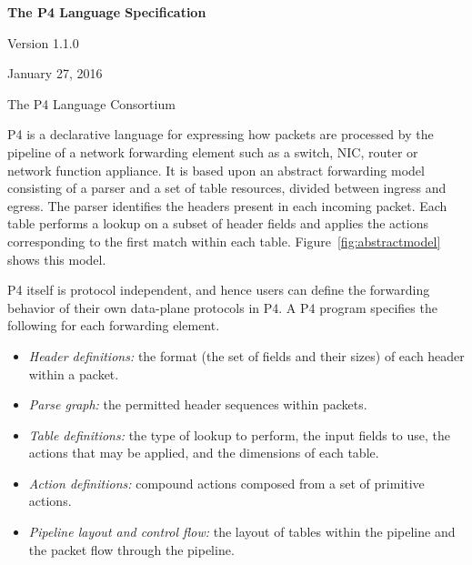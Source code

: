 \documentclass[12pt]{article}
\begin{document}
\vspace{2cm}

\centerline{\sffamily\bfseries\huge The P4 Language Specification}
\vspace{3mm}
\centerline{\sffamily\Large Version 1.1.0}
\vspace{3mm}
\centerline{\sffamily\large January 27, 2016}
\vspace{8mm}
\centerline{\sffamily\large The P4 Language Consortium}

\date{January 27, 2016}
\thispagestyle{firstpagestyle}


P4 is a declarative language for expressing how packets are processed by the 
pipeline of a network forwarding element such as a switch, NIC, router or 
network function appliance. It is based upon an abstract forwarding model 
consisting of a parser and a set of \matchaction table resources, divided 
between ingress and egress. The parser identifies the headers present in 
each incoming packet. Each \matchaction table performs a lookup on a subset 
of header fields and applies the actions corresponding to the first match 
within each table. Figure~\ref{fig:abstractmodel} shows this model.

P4 itself is protocol independent, and hence users can define the forwarding
behavior of their own data-plane protocols in P4.
A P4 program specifies the following for each forwarding 
element.

\begin{itemize}
\item
\textit{Header definitions:} the format (the set of fields and their
sizes) of each header within a packet.
\item
\textit{Parse graph:} the permitted header sequences within packets.
\item
\textit{Table definitions:} the type of lookup to perform, the input
fields to use, the actions that may be applied, and the dimensions of
each table.
\item
\textit{Action definitions:} compound actions composed from a set of
primitive actions.
\item
\textit{Pipeline layout and control flow:} the layout of tables within
the pipeline and the packet flow through the pipeline.
\end{itemize}
\end{document}
